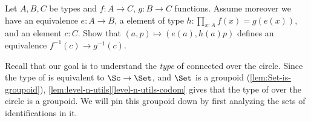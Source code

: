 \begin{xca}\label{xca:preim-eq}
  Let $A,B,C$ be types and $f:A\to C$, $g:B\to C$ functions. Assume moreover we
  have an equivalence $e: A\to B$, a element of type $h: \prod_{x:A}
  f(x)=g(e(x))$, and an element $c:C$.  Show that $(a,p)\mapsto (e(a),h(a)p)$
  defines an equivalence $f^{-1}(c)\to g^{-1}(c)$.
\end{xca}

Recall that our goal is to understand the \emph{type} of connected
\coverings over the circle. Since the type of \coverings is
equivalent to $\Sc\to \Set$, and $\Set$ is a groupoid
(\cref{lem:Set-is-groupoid}),
\cref{lem:level-n-utils}\ref{level-n-utils-codom} gives
that the type of \coverings over the circle is a groupoid.
We will pin this groupoid down by first analyzing the sets of
identifications in it.

